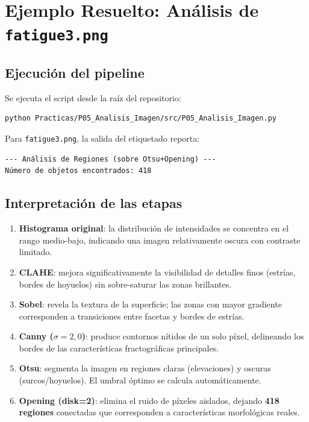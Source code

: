 \documentclass[12pt,a4paper]{article}
\begin{document}
\section{Ejemplo Resuelto: Análisis de \texttt{fatigue3.png}}
\label{sec:ejemplo}

\subsection{Ejecución del pipeline}

Se ejecuta el script desde la raíz del repositorio:

\begin{lstlisting}[language=bash]
python Practicas/P05_Analisis_Imagen/src/P05_Analisis_Imagen.py
\end{lstlisting}

Para \texttt{fatigue3.png}, la salida del etiquetado reporta:

\begin{verbatim}
--- Análisis de Regiones (sobre Otsu+Opening) ---
Número de objetos encontrados: 418
\end{verbatim}

\subsection{Interpretación de las etapas}

\begin{enumerate}
	\item \textbf{Histograma original}: la distribución de intensidades se
	      concentra en el rango medio-bajo, indicando una imagen relativamente
	      oscura con contraste limitado.
	\item \textbf{CLAHE}: mejora significativamente la visibilidad de
	      detalles finos (estrías, bordes de hoyuelos) sin sobre-saturar las
	      zonas brillantes.
	\item \textbf{Sobel}: revela la textura de la superficie; las zonas con
	      mayor gradiente corresponden a transiciones entre facetas y bordes
	      de estrías.
	\item \textbf{Canny ($\sigma = 2{,}0$)}: produce contornos nítidos de
	      un solo píxel, delineando los bordes de las características
	      fractográficas principales.
	\item \textbf{Otsu}: segmenta la imagen en regiones claras (elevaciones)
	      y oscuras (surcos/hoyuelos).  El umbral óptimo se calcula
	      automáticamente.
	\item \textbf{Opening (disk=2)}: elimina el ruido de píxeles aislados,
	      dejando \textbf{418 regiones} conectadas que corresponden a
	      características morfológicas reales.
\end{enumerate}
\end{document}
